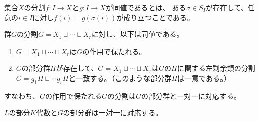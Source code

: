 \begin{proposition}
    \label{decomp-equiv, decomposition-def}
    集合$X$の分割$f:I\to X$と$g:I\to X$が同値であるとは、
    ある$\sigma\in S_I$が存在して、任意の$i\in I$に対し$f(i)=g(\sigma(i))$が成り立つことである。
\end{proposition}

\begin{proposition}\label{group-decomp}
    群$G$の分割$G=X_1\sqcup\cdots\sqcup X_r$に対し、以下は同値である。
    \begin{enumerate}
        \item $G=X_1\sqcup\cdots\sqcup X_r$は$G$の作用で保たれる。
        \item $G$の部分群$H$が存在して、$G=X_1\sqcup\cdots\sqcup X_r$は$G$の$H$に関する左剰余類の分割$G=g_1H\sqcup\cdots g_rH$と一致する。（このような部分群$H$は一意である。）
    \end{enumerate}
    すなわち、$G$の作用で保たれる$G$の分割は$G$の部分群と一対一に対応する。
\end{proposition}

\begin{theorem}\label{main}
    $L$の部分$K$代数と$G$の部分群は一対一に対応する。
\end{theorem}